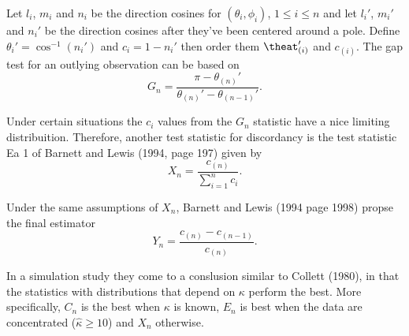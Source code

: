\documentclass{article}\usepackage{graphicx, color}
\begin{document}
Let $l_i$, $m_i$ and $n_i$ be the direction cosines for $(\theta_i,\phi_i)$, $1\leq i\leq n$ and let $l_i'$, $m_i'$ and $n_i'$ be the direction cosines after they've been centered around a pole.  Define $\theta_i'=\cos^{-1}(n_i')$ and $c_i=1-n_i'$ then order them $\theat_{(i)}'$ and $c_{(i)}$.  The gap test for an outlying observation can be based on
\[
G_n=\frac{\pi-\theta_{(n)}'}{\theta_{(n)}'-\theta_{(n-1)}'}.
\]

Under certain situations the $c_i$ values from the $G_n$ statistic have a nice limiting distribuition.  Therefore, another test statistic for discordancy is the test statistic Ea 1 of Barnett and Lewis (1994, page 197) \cite{barnett1994} given by
\[
X_n=\frac{c_{(n)}}{\sum_{i=1}^nc_i}.
\]

Under the same assumptions of $X_n$, Barnett and Lewis (1994 page 1998) propse the final estimator
\[
Y_n=\frac{c_{(n)}-c_{(n-1)}}{c_{(n)}}.
\]

In a simulation study they come to a conslusion similar to Collett (1980), in that the statistics with distributions that depend on $\kappa$ perform the best.  More specifically, $C_n$ is the best when $\kappa$ is known, $E_n$ is best when the data are concentrated ($\hat{\kappa}\geq 10$) and $X_n$ otherwise.



\end{document}
